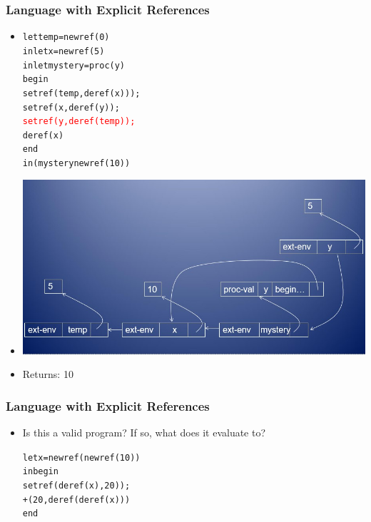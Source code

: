 \documentclass{beamer}
\begin{document}
\begin{frame}[fragile]
\frametitle{Language with Explicit References}
\begin{scriptsize}
\begin{itemize}
\item<1->
\begin{alltt}
let temp = newref(0)
in  let x = newref(5)
    in  let mystery = proc (y)
                        begin
                          setref(temp, deref(x)));
                          setref(x, deref(y));
                          \textcolor{red}{setref(y, deref(temp));}
                          deref(x)
				        end
	    in (mystery newref(10))
\end{alltt}

\item<1->
\begin{center}
\includegraphics[scale=0.5]{mystery4.jpg}
\end{center}

\item<1-> Returns: 10

\end{itemize}
\end{scriptsize}
\end{frame}

\begin{frame}[fragile]
\frametitle{Language with Explicit References}
\begin{scriptsize}
\begin{itemize}
\item<1-> Is this a valid program? If so, what does it evaluate to?
\begin{alltt}
let x = newref(newref(10))
in begin
	setref(deref(x), 20));
	 +(20, deref(deref(x)))
   end
\end{alltt}

\end{itemize}
\end{scriptsize}
\end{frame}
\end{document}
